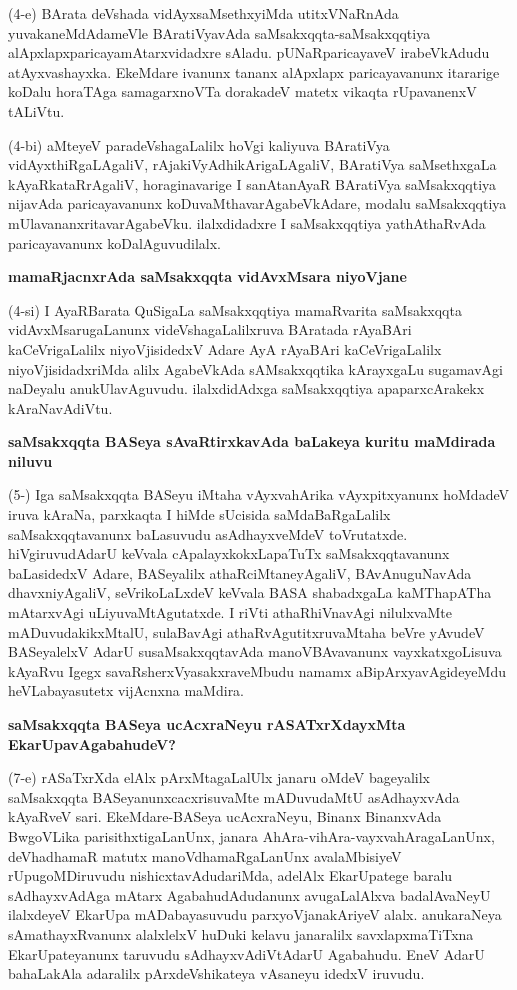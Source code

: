 \noindent
(4-e) BArata deVshada vidAyxsaMsethxyiMda utitxVNaRnAda yuvakaneMdAdameVle BAratiVyavAda saM\-sakxqqta-saMsakxqqtiya alApxlapxparicayamAtarxvidadxre sAladu. pUNaRparicayaveV irabeVkAdudu \-atAyx\-vashayxka. EkeMdare ivanunx tananx alApxlapx paricayavanunx itararige koDalu horaTAga samagarxnoVTa dora\-kadeV matetx vikaqta rUpavanenxV tALiVtu.

\smallskip
\noindent
(4-bi) aMteyeV paradeVshagaLalilx hoVgi kaliyuva BAratiVya vidAyxthiRgaLA\-galiV, rAjakiVyAdhi\-kArigaLAgaliV, BAratiVya saMsethxgaLa kAyaRkataRrAgaliV, horaginavarige I sanAtanAyaR BAra\-tiVya saMsakxqqtiya nijavAda paricaya\-vanunx koDuvaMthavarAgabeVkAdare, modalu saMsakxqqtiya mUla\-vananxrita\-varAga\-beVku. ilalxdidadxre I saMsakxqqtiya yathAthaRvAda paricayavanunx koDalAgu\-vudilalx.

{\bigskip
\noindent
{\large\bf mamaRjacnxrAda saMsakxqqta vidAvxMsara niyoVjane}}\label{page32}
\medskip

\noindent
(4-si) I AyaRBarata QuSigaLa saMsakxqqtiya mamaRvarita saMsakxqqta vidAvxMsaru\-gaLanunx videVsha\-gaLalilxruva BAratada rAyaBAri kaCeVrigaLalilx niyoVjisidedxV Adare AyA rAyaBAri kaCeVri\-gaLalilx niyoVjisidadx\-riMda alilx AgabeVkAda sAMsakxqqtika kArayxgaLu sugamavAgi naDeyalu anukUlavAgu\-vudu. ilalxdidAdxga saMsakxqqtiya apaparxcArakekx kAraNavAdiVtu.

{\bigskip
\noindent
{\large\bf saMsakxqqta BASeya sAvaRtirxkavAda baLakeya kuritu maMdirada niluvu}}\label{page33}
\medskip

\noindent
(5-) Iga saMsakxqqta BASeyu iMtaha vAyxvahArika vAyxpitxyanunx hoMdadeV iruva kAraNa, parxkaqta I hiMde sUcisida saMdaBaRgaLalilx saMsakxqqtavanunx baLasuvudu asAdhayx\-veMdeV toVrutatxde. hiVgiruvu\-dAdarU keVvala cApalayxkokxLapaTuTx saMsakxqqta\-vanunx baLasidedxV Adare, BASeyalilx athaRciMtane\-yAgaliV, BAvAnuguNavAda dhavxni\break\-yAgaliV, seVrikoLaLxdeV keVvala BASA shabadxgaLa kaMThapATha mAtarxvAgi uLiyu\-vaMtAgutatxde. I riVti athaRhiVnavAgi nilulxvaMte mADuvudakikxMtalU, sulaBa\-vAgi athaR\-vAgu\-titxru\-vaMtaha beVre yAvudeV BASeyalelxV AdarU susaMsakxqqta\-vAda manoVBAvavanunx vayxkatx\-goLisuva kA\-yaRvu Igegx savaRsherxVyasakxraveMbudu namamx aBipArxyavAgideyeMdu heVLabayasutetx vijAcnxna maMdira.

{\bigskip
\noindent
{\large\bf saMsakxqqta BASeya ucAcxraNeyu rASATxrXdayxMta EkarUpavAgabahudeV?}}\label{page33}
\medskip

\noindent
(7-e) rASaTxrXda elAlx pArxMtagaLalUlx janaru oMdeV bageyalilx saMsakxqqta BASeyanunx\-cacxrisu\-vaMte mADuvu\-daMtU asAdhayxvAda kAyaRveV sari. EkeMdare-BASeya ucAcxraNeyu, Binanx Binanx\-vAda BwgoV\-Lika parisithxtigaLanUnx, janara AhAra-\-vihAra\--vayxvahAragaLanUnx, deVhadhamaR matutx manoVdha\-maRgaLanUnx avalaMbisiyeV rUpugoMDiruvudu nishicxtavAdudariMda, adelAlx EkarUpatege baralu sAdhayx\-vAdAga mAtarx AgabahudAdudanunx avugaLalAlxva badalAvaNeyU ilalxdeyeV EkarUpa mADa\-bayasuvudu parxyoVjanakAriyeV alalx. anukaraNeya sAmathayxRvanunx alalxlelxV huDuki kelavu jana\-ralilx savxlapxmaTiTxna EkarUpateyanunx taruvudu sAdhayxvAdiVtAdarU Agabahudu. EneV AdarU bahaLa\-kAla adaralilx pArxdeV\-shikateya vAsaneyu idedxV iruvudu.

